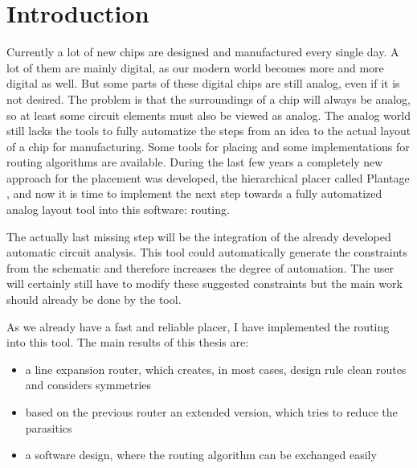 \chapter{Introduction}

Currently a lot of new chips are designed and manufactured every single day. A lot of them are mainly digital, as our modern world becomes more and more digital as well. But some parts of these digital chips are still analog, even if it is not desired. The problem is that the surroundings of a chip will always be analog, so at least some circuit elements must also be viewed as analog. The analog world still lacks the tools to fully automatize the steps from an idea to the actual layout of a chip for manufacturing. Some tools for placing and some implementations for routing algorithms are available. During the last few years a completely new approach for the placement was developed, the hierarchical placer called Plantage \cite{iccad:plantage}, and now it is time to implement the next step towards a fully automatized analog layout tool into this software: routing.

The actually last missing step will be the integration of the already developed automatic circuit analysis. This tool could automatically generate the constraints from the schematic and therefore increases the degree of automation. The user will certainly still have to modify these suggested constraints but the main work should already be done by the tool.

As we already have a fast and reliable placer, I have implemented the routing into this tool. The main results of this thesis are:
\begin{itemize}
\item a line expansion router, which creates, in most cases, design rule clean routes and considers symmetries
\item based on the previous router an extended version, which tries to reduce the parasitics
\item a software design, where the routing algorithm can be exchanged easily
\end{itemize}